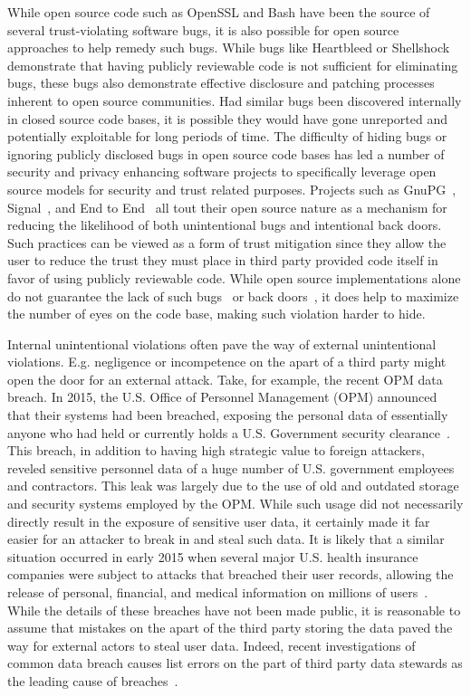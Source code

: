While open source code such as OpenSSL and Bash have been the source
of several trust-violating software bugs, it is also possible for open
source approaches to help remedy such bugs. While bugs like Heartbleed
or Shellshock demonstrate that having publicly reviewable code is not
sufficient for eliminating bugs, these bugs also demonstrate effective
disclosure and patching processes inherent to open source
communities. Had similar bugs been discovered internally in closed
source code bases, it is possible they would have gone unreported and
potentially exploitable for long periods of time. The difficulty of
hiding bugs or ignoring publicly disclosed bugs in open source code
bases has led a number of security and privacy enhancing software
projects to specifically leverage open source models for security and
trust related purposes. Projects such as GnuPG~\cite{gnupg},
Signal~\cite{openwhisper}, and End to End~\cite{google-endtoend,
  yahoo-endtoend} all tout their open source nature as a mechanism for
reducing the likelihood of both unintentional bugs and intentional
back doors. Such practices can be viewed as a form of trust mitigation
since they allow the user to reduce the trust they must place in third
party provided code itself in favor of using publicly reviewable
code. While open source implementations alone do not guarantee the
lack of such bugs~\cite{frosch2014} or back doors~\cite{thompson1984},
it does help to maximize the number of eyes on the code base, making
such violation harder to hide.

Internal unintentional violations often pave the way of external
unintentional violations. E.g. negligence or incompetence on the apart
of a third party might open the door for an external attack. Take, for
example, the recent OPM data breach. In 2015, the U.S. Office of
Personnel Management (OPM) announced that their systems had been
breached, exposing the personal data of essentially anyone who had
held or currently holds a U.S. Government security
clearance~\cite{ars-opmhack, opm-cybersecurityincidents}. This breach,
in addition to having high strategic value to foreign attackers,
reveled sensitive personnel data of a huge number of U.S. government
employees and contractors. This leak was largely due to the use of old
and outdated storage and security systems employed by the OPM. While
such usage did not necessarily directly result in the exposure of
sensitive user data, it certainly made it far easier for an attacker
to break in and steal such data. It is likely that a similar situation
occurred in early 2015 when several major U.S. health insurance
companies were subject to attacks that breached their user records,
allowing the release of personal, financial, and medical information
on millions of users~\cite{krebs-anthem, krebs-premera}. While the
details of these breaches have not been made public, it is reasonable
to assume that mistakes on the apart of the third party storing the
data paved the way for external actors to steal user data. Indeed,
recent investigations of common data breach causes list errors on the
part of third party data stewards as the leading cause of
breaches~\cite{gallagher-blame, verizon-2016breach}.

